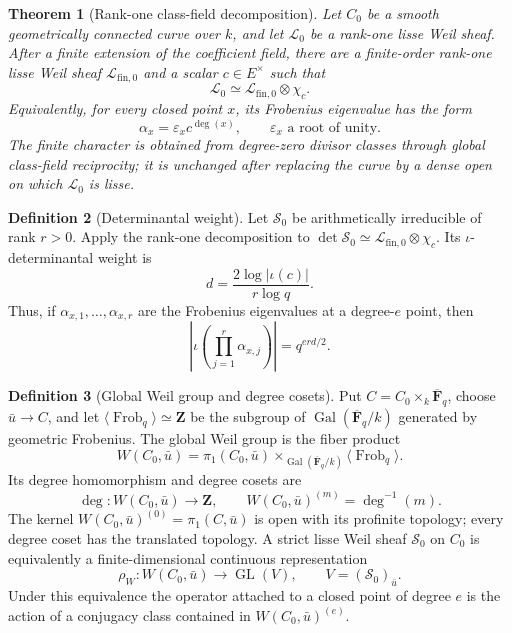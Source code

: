 \documentclass[10pt]{article}
\newtheorem{theorem}{Theorem}[section]
\theoremstyle{definition}
\newtheorem{definition}[theorem]{Definition}
\newcommand{\Fbar}{\overline{\mathbf F}_q}
\newcommand{\Frob}{\operatorname{Frob}}
\begin{document}
\begin{theorem}[Rank-one class-field decomposition]
Let \(C_0\) be a smooth geometrically connected curve over \(k\), and let
\(\mathcal L_0\) be a rank-one lisse Weil sheaf.  After a finite extension
of the coefficient field, there are a finite-order rank-one lisse Weil
sheaf \(\mathcal L_{\mathrm{fin},0}\) and a scalar \(c\in E^\times\) such
that
\[
 \mathcal L_0\simeq\mathcal L_{\mathrm{fin},0}\otimes\chi_c.
\]
Equivalently, for every closed point \(x\), its Frobenius eigenvalue has the
form
\[
 \alpha_x=\varepsilon_xc^{\deg(x)},
 \qquad \varepsilon_x\text{ a root of unity}.
\]
The finite character is obtained from degree-zero divisor classes through
global class-field reciprocity; it is unchanged after replacing the curve
by a dense open on which \(\mathcal L_0\) is lisse.
\end{theorem}

\begin{definition}[Determinantal weight]
Let \(\mathcal S_0\) be arithmetically irreducible of rank \(r>0\).  Apply
the rank-one decomposition to
\(\det\mathcal S_0\simeq\mathcal L_{\mathrm{fin},0}\otimes\chi_c\).
Its \(\iota\)-determinantal weight is
\[
 d=\frac{2\log|\iota(c)|}{r\log q}.
\]
Thus, if \(\alpha_{x,1},\ldots,\alpha_{x,r}\) are the Frobenius
eigenvalues at a degree-\(e\) point, then
\[
 \left|\iota\!\left(\prod_{j=1}^r\alpha_{x,j}\right)\right|
       =q^{erd/2}.
\]
\end{definition}

\begin{definition}[Global Weil group and degree cosets]
Put \(C=C_0\times_k\Fbar\), choose \(\bar u\to C\), and let
\(\langle\Frob_q\rangle\simeq\mathbf Z\) be the subgroup of
\(\operatorname{Gal}(\Fbar/k)\) generated by geometric Frobenius.  The
global Weil group is the fiber product
\[
 W(C_0,\bar u)=
 \pi_1(C_0,\bar u)
 \mathop{\times}_{\operatorname{Gal}(\Fbar/k)}
 \langle\Frob_q\rangle .
\]
Its degree homomorphism and degree cosets are
\[
 \deg:W(C_0,\bar u)\longrightarrow\mathbf Z,
 \qquad
 W(C_0,\bar u)^{(m)}=\deg^{-1}(m).
\]
The kernel \(W(C_0,\bar u)^{(0)}=\pi_1(C,\bar u)\) is open with its
profinite topology; every degree coset has the translated topology.  A
strict lisse Weil sheaf \(\mathcal S_0\) on \(C_0\) is equivalently a
finite-dimensional continuous representation
\[
 \rho_W:W(C_0,\bar u)\longrightarrow\operatorname{GL}(V),
 \qquad V=(\mathcal S_0)_{\bar u}.
\]
Under this equivalence the operator attached to a closed point of degree
\(e\) is the action of a conjugacy class contained in
\(W(C_0,\bar u)^{(e)}\).
\end{definition}
\end{document}
